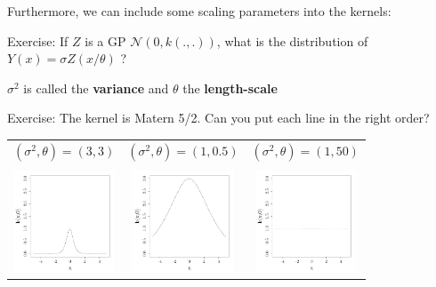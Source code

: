 \begin{frame}{}
Furthermore, we can include some scaling parameters into the kernels:
\begin{exampleblock}{Exercise:}
If $Z$ is a GP $\mathcal{N}(0,k(.,.))$, what is the distribution of $Y(x) = \sigma Z(x/\theta)$ ?
\end{exampleblock}
\vspace{5mm}
$\sigma^2$ is called the \textbf{variance} and $\theta$ the \textbf{length-scale}
\end{frame}

\begin{frame}{}
\begin{exampleblock}{Exercise: }
The kernel is Matern 5/2. Can you put each line in the right order?
\begin{center}
\begin{tabular}{ccc}
$(\sigma^2,\theta) = (3,3)$& $(\sigma^2,\theta)=(1,0.5)$& $(\sigma^2,\theta)=(1,50)$ \\
&&\\
\includegraphics[height=3cm]{1_stat_models/figures/R/MVN_kern105} &\includegraphics[height=3cm]{1_stat_models/figures/R/MVN_kern33}& \includegraphics[height=3cm]{1_stat_models/figures/R/MVN_kern150}\\

\end{tabular}
\end{center}
\end{exampleblock}
\end{frame}
